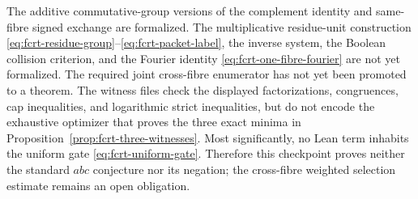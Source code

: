 The additive commutative-group versions of the complement identity and
same-fibre signed exchange are formalized.  The multiplicative residue-unit
construction \eqref{eq:fcrt-residue-group}--\eqref{eq:fcrt-packet-label}, the
inverse system, the Boolean collision criterion, and the Fourier identity
\eqref{eq:fcrt-one-fibre-fourier} are not yet formalized.  The required joint
cross-fibre enumerator has not yet been promoted to a theorem.  The witness
files check the displayed factorizations,
congruences, cap inequalities, and logarithmic strict inequalities, but do
not encode the exhaustive optimizer that proves the three exact minima in
Proposition~\ref{prop:fcrt-three-witnesses}.  Most significantly, no Lean
term inhabits the uniform gate \eqref{eq:fcrt-uniform-gate}.  Therefore this
checkpoint proves neither the standard $abc$ conjecture nor its negation;
the cross-fibre weighted selection estimate remains an open obligation.
